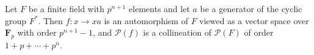 Let $F$ be a finite field with $p^{n+1}$ elements and let $a$ be a generator of the cyclic group $F^*$. Then $f: x \rightarrow xa$ is an automorphism of $F$ viewed as a vector space over $\mathbf{F}_p$ with order $p^{n+1}-1$, and $\mathcal{P}(f)$ is a collineation of $\mathcal{P}(F)$ of order $1+p+\cdots+p^n$.

